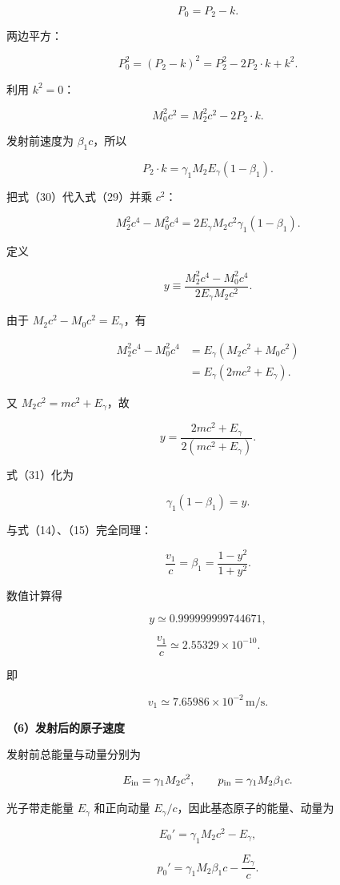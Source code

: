 \documentclass[12pt,a4paper,UTF8]{ctexart}
\begin{document}
\[
P_0=P_2-k.
\tag{28}
\]

两边平方：

\[
P_0^2=(P_2-k)^2=P_2^2-2P_2\cdot k+k^2.
\]

利用 \(k^2=0\)：

\[
M_0^2c^2=M_2^2c^2-2P_2\cdot k.
\tag{29}
\]

发射前速度为 \(\beta_1c\)，所以

\[
P_2\cdot k
=\gamma_1M_2E_\gamma(1-\beta_1).
\tag{30}
\]

把式（30）代入式（29）并乘 \(c^2\)：

\[
M_2^2c^4-M_0^2c^4
=2E_\gamma M_2c^2\gamma_1(1-\beta_1).
\tag{31}
\]

定义

\[
y\equiv
\frac{M_2^2c^4-M_0^2c^4}
{2E_\gamma M_2c^2}.
\tag{32}
\]

由于 \(M_2c^2-M_0c^2=E_\gamma\)，有

\[
\begin{aligned}
M_2^2c^4-M_0^2c^4
&=E_\gamma(M_2c^2+M_0c^2)\\
&=E_\gamma(2mc^2+E_\gamma).
\end{aligned}
\]

又 \(M_2c^2=mc^2+E_\gamma\)，故

\[
\boxed{
y=\frac{2mc^2+E_\gamma}
{2(mc^2+E_\gamma)}
}.
\tag{33}
\]

式（31）化为

\[
\gamma_1(1-\beta_1)=y.
\tag{34}
\]

与式（14）、（15）完全同理：

\[
\boxed{
\frac{v_1}{c}=\beta_1=\frac{1-y^2}{1+y^2}
}.
\tag{35}
\]

数值计算得

\[
y\simeq0.999999999744671,
\]

\[
\boxed{
\frac{v_1}{c}
\simeq2.55329\times10^{-10}
}.
\tag{36}
\]

即

\[
\boxed{
v_1\simeq7.65986\times10^{-2}\,\mathrm{m/s}
}.
\tag{37}
\]

\textbf{（6）发射后的原子速度}

发射前总能量与动量分别为

\[
E_{\rm in}=\gamma_1M_2c^2,
\qquad
p_{\rm in}=\gamma_1M_2\beta_1c.
\]

光子带走能量 \(E_\gamma\) 和正向动量
\(E_\gamma/c\)，因此基态原子的能量、动量为

\[
E_0'=\gamma_1M_2c^2-E_\gamma,
\tag{38}
\]

\[
p_0'=\gamma_1M_2\beta_1c-\frac{E_\gamma}{c}.
\tag{39}
\]
\end{document}
